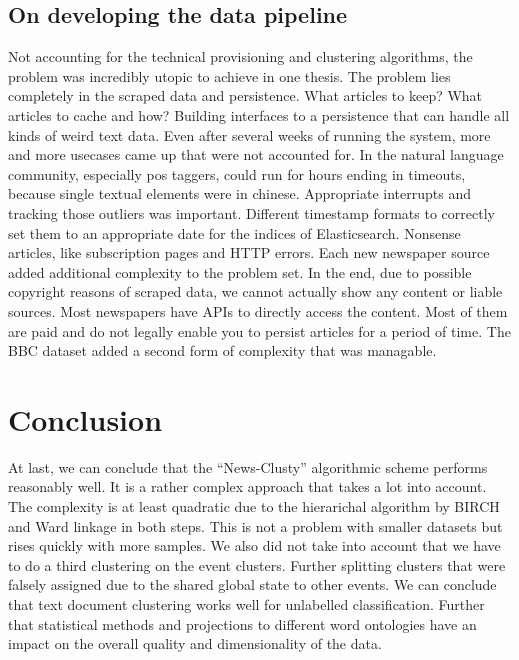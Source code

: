 \subsection*{On developing the data pipeline} 
Not accounting for the technical provisioning and clustering algorithms, the problem was incredibly utopic to achieve in one thesis. The problem lies completely in the scraped data and persistence. What articles to keep? What articles to cache and how? Building interfaces to a persistence that can handle all kinds of weird text data. Even after several weeks of running the system, more and more usecases came up that were not accounted for. In the natural language community, especially pos taggers, could run for hours ending in timeouts, because single textual elements were in chinese. Appropriate interrupts and tracking those outliers was important. Different timestamp formats to correctly set them to an appropriate date for the indices of Elasticsearch. Nonsense articles, like subscription pages and HTTP errors. Each new newspaper source added additional complexity to the problem set. In the end, due to possible copyright reasons of scraped data, we cannot actually show any content or liable sources. Most newspapers have APIs to directly access the content. Most of them are paid and do not legally enable you to persist articles for a period of time. The BBC dataset added a second form of complexity that was managable.


\section{Conclusion}
At last, we can conclude that the ``News-Clusty'' algorithmic scheme performs reasonably well. It is a rather complex approach that takes a lot into account. The complexity is at least quadratic due to the hierarichal algorithm by BIRCH and Ward linkage in both steps. This is not a problem with smaller datasets but rises quickly with more samples. We also did not take into account that we have to do a third clustering on the event clusters. Further splitting clusters that were falsely assigned due to the shared global state to other events. We can conclude that text document clustering works well for unlabelled classification. Further that statistical methods and projections to different word ontologies have an impact on the overall quality and dimensionality of the data. 


